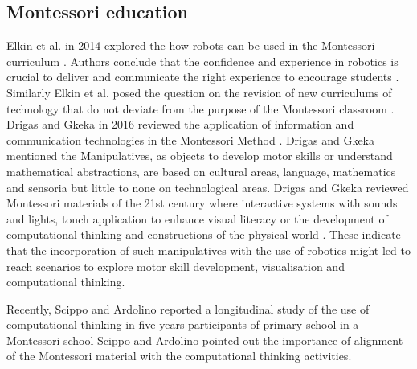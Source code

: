 \documentclass[conference]{IEEEtran}
\begin{document}
\subsection{Montessori education}
Elkin et al. in 2014 explored the how robots can be used in the Montessori curriculum \cite{elkin2014}.
Authors conclude that the confidence and experience in robotics is crucial to deliver and communicate the right experience to encourage students \cite{elkin2014}.
Similarly Elkin et al. posed the question on the revision of new curriculums of technology that do not deviate from the purpose of the Montessori classroom \cite{elkin2014}.
Drigas and Gkeka in 2016 reviewed the application of information and communication technologies in the Montessori Method \cite{DrigasGkeka2016}.
Drigas and Gkeka mentioned the Manipulatives, as objects to develop motor skills or understand mathematical abstractions, are based on cultural areas, language, mathematics and sensoria but little to none on technological areas.
Drigas and Gkeka reviewed Montessori materials of the 21st century where interactive systems with sounds and lights, touch application to enhance visual literacy or the development of computational thinking and constructions of the physical world \cite{DrigasGkeka2016}.
These indicate that the incorporation of such manipulatives with the use of robotics might led to reach scenarios to explore motor skill development, visualisation and computational thinking. 

Recently, Scippo and Ardolino reported a longitudinal study of the use of computational thinking in five years participants of primary school in a Montessori school \cite{ScippoArdolino2021}
Scippo and Ardolino pointed out the importance of alignment of the Montessori material with the computational thinking activities. 

\end{document}
